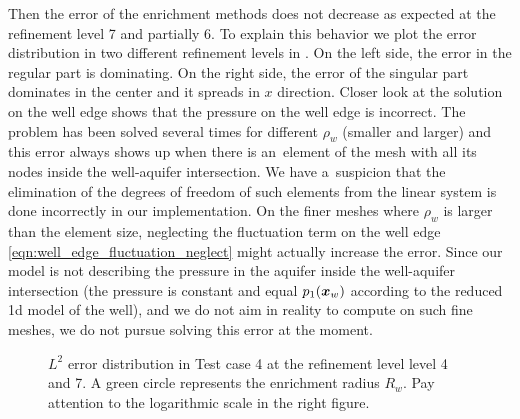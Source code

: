 Then the error of the enrichment methods does not decrease as expected at the refinement level 7 and partially 6. 
To explain this behavior we plot the error distribution in two different refinement levels in .
On the left side, the error in the regular part is dominating. On the right side, the error of the singular part dominates in the center
and it spreads in $x$ direction. Closer look at the solution on the well edge shows that the pressure on the well edge is incorrect.
The problem has been solved several times for different $\rho_w$ (smaller and larger) and this error always shows up when there is 
an~element of the mesh with all its nodes inside the well-aquifer intersection.
We have a~suspicion that the elimination of the degrees of freedom of such elements from the linear system is done incorrectly
in our implementation. On the finer meshes where $\rho_w$ is larger than the element size,
neglecting the fluctuation term on the well edge \eqref{eqn:well_edge_fluctuation_neglect} might actually increase the error.
Since our model is not describing the pressure in the aquifer inside the well-aquifer intersection
(the pressure is constant and equal $p_1(\mathbf{\boldsymbol{x}}_w)$ according to the reduced 1d model of the well),
and we do not aim in reality to compute on such fine meshes, we do not pursue solving this error at the moment.

\begin{figure}[!htb]
  \centering
  \hfill
  \caption[Error distribution in Test case 4]{$L^2$ error distribution in Test case 4 at the refinement level level 4 and 7.
  A green circle represents the enrichment radius $R_w$. Pay attention to the logarithmic scale in the right figure.}
  \label{fig:error_distribution_test4}
\end{figure}
%

